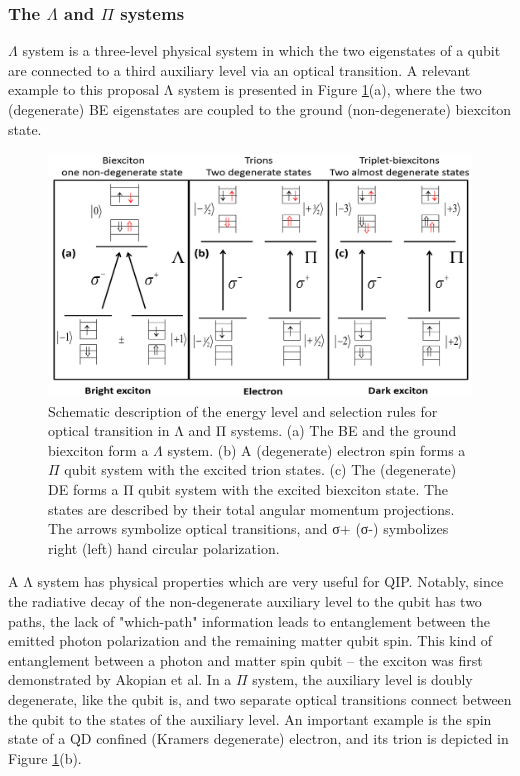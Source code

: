 \subsubsection{The $\Lambda $ and $\Pi$ systems}
$\Lambda$ system is a three-level physical system in which the two eigenstates of a qubit are connected to a third auxiliary level via an optical transition. A relevant example to this proposal Λ system is presented in Figure \ref{fig:PiSystem}(a), where the two (degenerate) BE eigenstates are coupled to the ground (non-degenerate) biexciton state.
\begin{figure}[H]
	\centering
	\includegraphics[scale=0.32]{figures/pISystem.png}
	\caption{Schematic description of the energy level and selection rules for
optical transition in Λ and Π systems. (a) The BE and the ground biexciton form a $\Lambda$ system. (b) A (degenerate) electron spin forms a $\Pi$ qubit system
with the excited trion states. (c) The (degenerate) DE forms a Π qubit system
with the excited biexciton state. The states are described by their total
angular momentum projections. The arrows symbolize optical transitions, and σ+ (σ-) symbolizes right (left) hand circular polarization.}
	\label{fig:PiSystem}
\end{figure}
A Λ system has physical properties which are very useful for QIP. Notably, since the radiative decay of the non-degenerate auxiliary level to the qubit has two paths, the lack of "which-path" information leads to entanglement
between the emitted photon polarization and the remaining matter qubit spin. This kind of entanglement between a photon and matter spin qubit – the exciton was first demonstrated by Akopian et al. \cite{Akopian2006}
In a $\Pi$ system, the auxiliary level is doubly degenerate, like the qubit is, and two separate optical transitions connect between the qubit to the states of the auxiliary level. An important example is the spin state of a QD confined (Kramers degenerate) electron, and its trion is depicted in Figure \ref{fig:PiSystem}(b).\\
